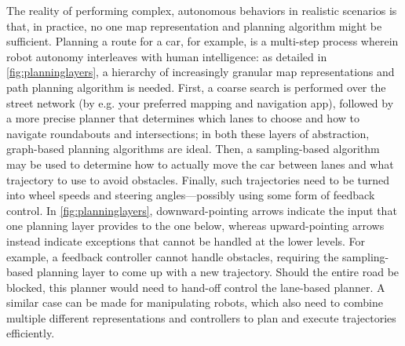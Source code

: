 The reality of performing complex, autonomous behaviors in realistic scenarios is that, in practice, no one map representation and planning algorithm might be sufficient.
Planning a route for a car, for example, is a multi-step process wherein robot autonomy interleaves with human intelligence: as detailed in \cref{fig:planninglayers}, a hierarchy of increasingly granular map representations and path planning algorithm is needed.
First, a coarse search is performed over the street network (by e.g. your preferred mapping and navigation app), followed by a more precise planner that determines which lanes to choose and how to navigate roundabouts and intersections; in both these layers of abstraction, graph-based planning algorithms are ideal.
Then, a sampling-based algorithm may be used to determine how to actually move the car between lanes and what trajectory to use to avoid obstacles.
Finally, such trajectories need to be turned into wheel speeds and steering angles---possibly using some form of feedback control.
In \cref{fig:planninglayers}, downward-pointing arrows indicate the input that one planning layer provides to the one below, whereas upward-pointing arrows instead indicate exceptions that cannot be handled at the lower levels. For example, a feedback controller cannot handle obstacles, requiring the sampling-based planning layer to come up with a new trajectory. Should the entire road be blocked, this planner would need to hand-off control the lane-based planner. A similar case can be made for manipulating robots, which also need to combine multiple different representations and controllers to plan and execute trajectories efficiently.

